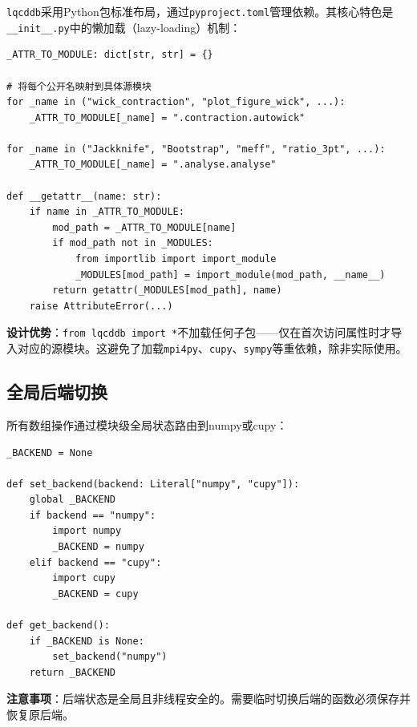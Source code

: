 \documentclass[11pt,a4paper]{ctexart}
\begin{document}
\texttt{lqcddb}采用Python包标准布局，通过\texttt{pyproject.toml}管理依赖。其核心特色是\texttt{\_\_init\_\_.py}中的懒加载（lazy-loading）机制：

\begin{codebox}
\begin{lstlisting}[style=python]
_ATTR_TO_MODULE: dict[str, str] = {}

# 将每个公开名映射到具体源模块
for _name in ("wick_contraction", "plot_figure_wick", ...):
    _ATTR_TO_MODULE[_name] = ".contraction.autowick"

for _name in ("Jackknife", "Bootstrap", "meff", "ratio_3pt", ...):
    _ATTR_TO_MODULE[_name] = ".analyse.analyse"

def __getattr__(name: str):
    if name in _ATTR_TO_MODULE:
        mod_path = _ATTR_TO_MODULE[name]
        if mod_path not in _MODULES:
            from importlib import import_module
            _MODULES[mod_path] = import_module(mod_path, __name__)
        return getattr(_MODULES[mod_path], name)
    raise AttributeError(...)
\end{lstlisting}
\end{codebox}

\textbf{设计优势}：\texttt{from lqcddb import *}不加载任何子包——仅在首次访问属性时才导入对应的源模块。这避免了加载\texttt{mpi4py}、\texttt{cupy}、\texttt{sympy}等重依赖，除非实际使用。

\subsection{全局后端切换}

所有数组操作通过模块级全局状态路由到numpy或cupy：

\begin{codebox}
\begin{lstlisting}[style=python]
_BACKEND = None

def set_backend(backend: Literal["numpy", "cupy"]):
    global _BACKEND
    if backend == "numpy":
        import numpy
        _BACKEND = numpy
    elif backend == "cupy":
        import cupy
        _BACKEND = cupy

def get_backend():
    if _BACKEND is None:
        set_backend("numpy")
    return _BACKEND
\end{lstlisting}
\end{codebox}

\textbf{注意事项}：后端状态是全局且非线程安全的。需要临时切换后端的函数必须保存并恢复原后端。
\end{document}
